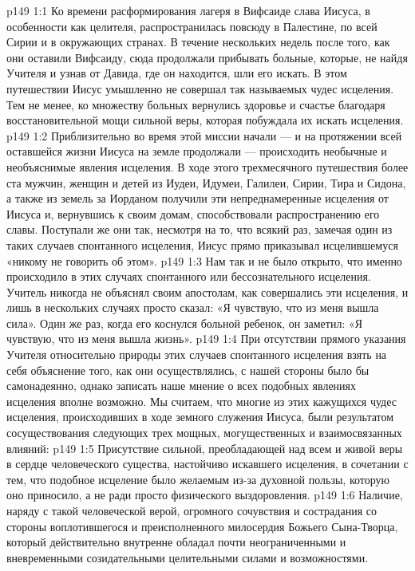 \vs p149 1:1 Ко времени расформирования лагеря в Вифсаиде слава Иисуса, в особенности как целителя, распространилась повсюду в Палестине, по всей Сирии и в окружающих странах. В течение нескольких недель после того, как они оставили Вифсаиду, сюда продолжали прибывать больные, которые, не найдя Учителя и узнав от Давида, где он находится, шли его искать. В этом путешествии Иисус умышленно не совершал так называемых чудес исцеления. Тем не менее, ко множеству больных вернулись здоровье и счастье благодаря восстановительной мощи сильной веры, которая побуждала их искать исцеления.
\vs p149 1:2 Приблизительно во время этой миссии начали --- и на протяжении всей оставшейся жизни Иисуса на земле продолжали --- происходить необычные и необъяснимые явления исцеления. В ходе этого трехмесячного путешествия более ста мужчин, женщин и детей из Иудеи, Идумеи, Галилеи, Сирии, Тира и Сидона, а также из земель за Иорданом получили эти непреднамеренные исцеления от Иисуса и, вернувшись к своим домам, способствовали распространению его славы. Поступали же они так, несмотря на то, что всякий раз, замечая один из таких случаев спонтанного исцеления, Иисус прямо приказывал исцелившемуся «никому не говорить об этом».
\vs p149 1:3 \pc Нам так и не было открыто, что именно происходило в этих случаях спонтанного или бессознательного исцеления. Учитель никогда не объяснял своим апостолам, как совершались эти исцеления, и лишь в нескольких случаях просто сказал: «Я чувствую, что из меня вышла сила». Один же раз, когда его коснулся больной ребенок, он заметил: «Я чувствую, что из меня вышла жизнь».
\vs p149 1:4 При отсутствии прямого указания Учителя относительно природы этих случаев спонтанного исцеления взять на себя объяснение того, как они осуществлялись, с нашей стороны было бы самонадеянно, однако записать наше мнение о всех подобных явлениях исцеления вполне возможно. Мы считаем, что многие из этих кажущихся чудес исцеления, происходивших в ходе земного служения Иисуса, были результатом сосуществования следующих трех мощных, могущественных и взаимосвязанных влияний:
\vs p149 1:5 \bibnobreakspace Присутствие сильной, преобладающей над всем и живой веры в сердце человеческого существа, настойчиво искавшего исцеления, в сочетании с тем, что подобное исцеление было желаемым из\hyp{}за духовной пользы, которую оно приносило, а не ради просто физического выздоровления.
\vs p149 1:6 \pc {}\bibnobreakspace Наличие, наряду с такой человеческой верой, огромного сочувствия и сострадания со стороны воплотившегося и преисполненного милосердия Божьего Сына\hyp{}Творца, который действительно внутренне обладал почти неограниченными и вневременными созидательными целительными силами и возможностями.
